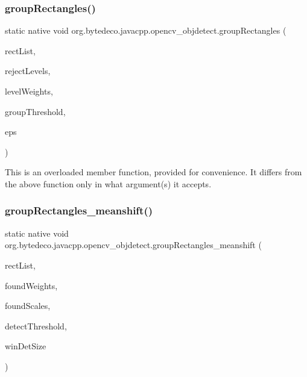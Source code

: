 \subsubsection{\texorpdfstring{group\+Rectangles()}{groupRectangles()}\hspace{0.1cm}{\footnotesize\ttfamily [4/4]}}
{\footnotesize\ttfamily static native void org.\+bytedeco.\+javacpp.\+opencv\+\_\+objdetect.\+group\+Rectangles (\begin{DoxyParamCaption}\item[{@By\+Ref Rect\+Vector}]{rect\+List,  }\item[{@Std\+Vector Int\+Pointer}]{reject\+Levels,  }\item[{@Std\+Vector Double\+Pointer}]{level\+Weights,  }\item[{int}]{group\+Threshold,  }\item[{double}]{eps }\end{DoxyParamCaption})\hspace{0.3cm}{\ttfamily [static]}}

This is an overloaded member function, provided for convenience. It differs from the above function only in what argument(s) it accepts. \mbox{\label{group__objdetect_ga4dcd81c59aa342c781c93522088dc6be}} 
\subsubsection{\texorpdfstring{group\+Rectangles\+\_\+meanshift()}{groupRectangles\_meanshift()}}
{\footnotesize\ttfamily static native void org.\+bytedeco.\+javacpp.\+opencv\+\_\+objdetect.\+group\+Rectangles\+\_\+meanshift (\begin{DoxyParamCaption}\item[{@By\+Ref Rect\+Vector}]{rect\+List,  }\item[{@Std\+Vector Double\+Pointer}]{found\+Weights,  }\item[{@Std\+Vector Double\+Pointer}]{found\+Scales,  }\item[{double}]{detect\+Threshold,  }\item[{@By\+Val(null\+Value=\char`\"{}cv\+::\+Size(64, 128)\char`\"{}) Size}]{win\+Det\+Size }\end{DoxyParamCaption})\hspace{0.3cm}{\ttfamily [static]}}

